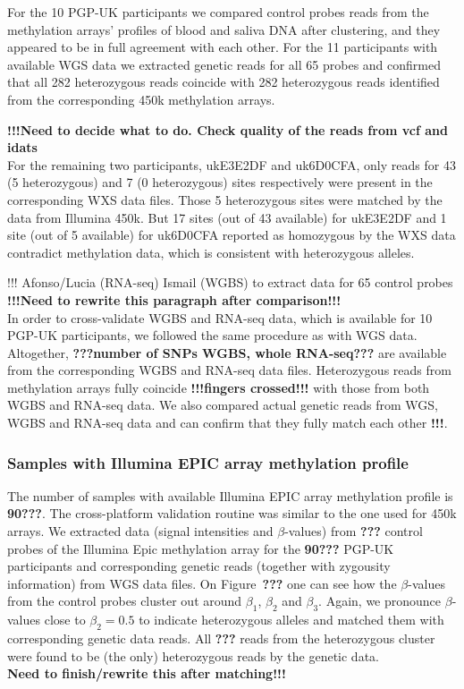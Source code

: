 \documentclass[english]{article}
\begin{document}
For the 10 PGP-UK participants we compared control probes reads from the methylation arrays' profiles of blood and saliva DNA after clustering, and they appeared to be in full agreement with each other. For the 11 participants with available WGS data we extracted genetic reads for all 65 probes and confirmed that all 282 heterozygous reads coincide with 282 heterozygous reads identified from the corresponding 450k methylation arrays.

\textbf{!!!Need to decide what to do. Check quality of the reads from vcf and idats}\\
For the remaining two participants, ukE3E2DF and uk6D0CFA, only reads for 43 (5 heterozygous) and 7 (0 heterozygous) sites respectively were present in the corresponding WXS data files. Those 5 heterozygous sites were matched by the data from Illumina 450k. But 17 sites (out of 43 available) for ukE3E2DF and 1 site (out of 5 available) for uk6D0CFA reported as homozygous by the WXS data contradict methylation data, which is consistent with heterozygous alleles.

\colorbox{BurntOrange}{!!! Afonso/Lucia (RNA-seq) Ismail (WGBS) to extract data for 65 control probes}\\ \textbf{!!!Need to rewrite this paragraph after comparison!!!}\\
In order to cross-validate WGBS and RNA-seq data, which is available for 10 PGP-UK participants, we followed the same procedure as with WGS data. Altogether, \textbf{???number of SNPs WGBS, whole RNA-seq???} are available from the corresponding WGBS and RNA-seq data files. Heterozygous reads from methylation arrays fully coincide \textbf{!!!fingers crossed!!!} with those from both WGBS and RNA-seq data. We also compared actual genetic reads from WGS, WGBS and RNA-seq data and can confirm that they fully match each other \textbf{!!!}. 

\subsubsection*{Samples with Illumina EPIC array methylation profile}
The number of samples with available Illumina EPIC array methylation profile is \textbf{90???}. The cross-platform validation routine was similar to the one used for 450k arrays. We extracted data (signal intensities and $\beta$-values) from \textbf{???} control probes of the Illumina Epic methylation array for the \textbf{90???} PGP-UK participants and corresponding genetic reads (together with zygousity information) from WGS data files. On Figure~\textbf{???} one can see how the $\beta$-values from the control probes cluster out around $\beta_1$, $\beta_2$ and $\beta_3$. Again, we pronounce $\beta$-values close to $\beta_2=0.5$ to indicate heterozygous alleles and matched them with corresponding genetic data reads. All \textbf{???} reads from the heterozygous cluster were found to be (the only) heterozygous reads by the genetic data.
\\
\textbf{Need to finish/rewrite this after matching!!!}
\end{document}
